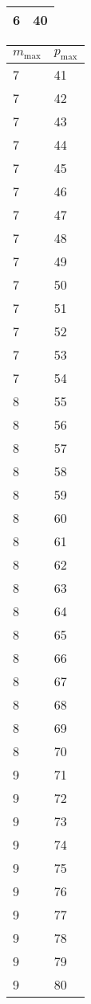 \begin{table}
\begin{tabular}{ll}
6 & 40 \\ 
   \hline
   \end{tabular}
   \begin{tabular}{ll}
   \hline
   $m_{\text{max}}$ & $p_{\text{max}}$ \\
   \hline
7 & 41 \\
7 & 42 \\
7 & 43 \\
7 & 44 \\
7 & 45 \\
7 & 46 \\
7 & 47 \\
7 & 48 \\
7 & 49 \\
7 & 50 \\
7 & 51 \\
7 & 52 \\
7 & 53 \\
7 & 54 \\
8 & 55 \\
8 & 56 \\
8 & 57 \\
8 & 58 \\
8 & 59 \\
8 & 60 \\
8 & 61 \\
8 & 62 \\
8 & 63 \\
8 & 64 \\
8 & 65 \\
8 & 66 \\
8 & 67 \\
8 & 68 \\
8 & 69 \\
8 & 70 \\
9 & 71 \\
9 & 72 \\
9 & 73 \\
9 & 74 \\
9 & 75 \\
9 & 76 \\
9 & 77 \\
9 & 78 \\
9 & 79 \\
9 & 80 \\


\end{tabular}
\end{table}
